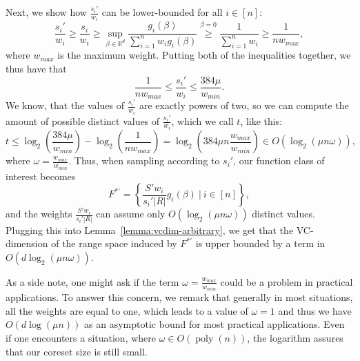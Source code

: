 Next, we show how $\frac{s_i'}{w_i}$ can be lower-bounded for all
$i \in [n]$:
\begin{equation*}
    \frac{s_i'}{w_i} \geq \frac{s_i}{w_i}
    \geq \sup_{\beta \in \mathbb{R}^d} \frac{g_i(\beta)}{\sum_{i=1}^n w_ig_i(\beta)}
    \overset{\beta = 0}{\geq} \frac{1}{\sum_{i=1}^n w_i}
    \geq \frac{1}{n w_{max}},
\end{equation*}
where $w_{max}$ is the maximum weight. Putting both of the inequalities
together, we thus have that
\begin{equation*}
    \frac{1}{n w_{max}} \leq \frac{s_i'}{w_i} \leq \frac{384\mu}{w_{min}}.
\end{equation*}
We know, that the values of $\frac{s_i'}{w_i}$ are exactly powers
of two, so we can compute the amount of possible distinct values of
$\frac{s_i'}{w_i}$, which we call $t$, like this:
\begin{equation*}
    t \leq \log_2\left( \frac{384 \mu}{w_{min}}\right)
    - \log_2\left( \frac{1}{n w_{max}}\right)
    = \log_2\left(384\mu n \frac{w_{max}}{w_{min}}\right)
    \in O\left(\log_2(\mu n \omega)\right),
\end{equation*}
where $\omega = \frac{w_{max}}{w_{min}}$.
Thus, when sampling according to $s_i'$, our function class of interest
becomes
\begin{equation*}
    F^{\ast'} = \left\{ \frac{S' w_i}{s_i' |R|} g_i(\beta) \ |\ i \in [n] \right\},
\end{equation*}
and the weights $\frac{S' w_i}{s_i' |R|}$ can assume only
$O(\log_2(\mu n \omega))$ distinct values.
Plugging this into Lemma~\ref{lemma:vcdim-arbitrary}, we get that
the VC-dimension of the range space induced by $F^{\ast'}$ is
upper bounded by a term in $O(d \log_2(\mu n \omega))$.

As a side note, one might ask if the term
$\omega = \frac{w_{max}}{w_{min}}$ could be a problem in practical
applications. To answer this concern, we remark that generally in most
situations, all the weights are equal to one, which leads
to a value of $\omega = 1$ and thus we have
$O(d \log(\mu n))$ as an asymptotic bound for most practical
applications. Even if one encounters a situation, where
$\omega \in O(\operatorname{poly}(n))$, the logarithm assures
that our coreset size is still small.

